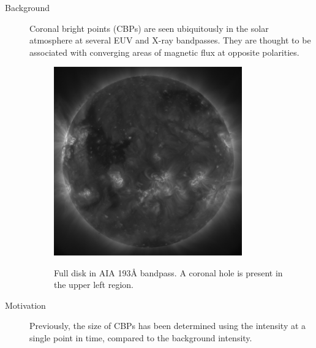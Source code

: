 \documentclass[t]{beamer}
\begin{document}
\begin{frame}[t]
\begin{columns}[t]
        \begin{tcolorbox}[title=Introduction]
            \begin{description}
                \item [Background]
                    Coronal bright points (CBPs) are seen ubiquitously in the solar atmosphere
                    at several EUV and X-ray bandpasses. They are thought to be
                    associated with converging areas of magnetic flux at
                    opposite polarities.
                \begin{figure}[t]
                    \vspace{1cm}
                    \includegraphics[width=0.8\textwidth]{full_disk.png}\\
                    \parbox{0.8\textwidth}{\caption{Full disk in AIA 193\AA{} bandpass.
                        A coronal hole is present in the upper left region.}}
                \end{figure}
                \item [Motivation]
                    Previously, the size of CBPs has been
                    determined using the intensity at a single point in time,
                    compared to the background intensity.
            \end{description}
        \end{tcolorbox}


\end{columns}
\end{frame}
\end{document}
